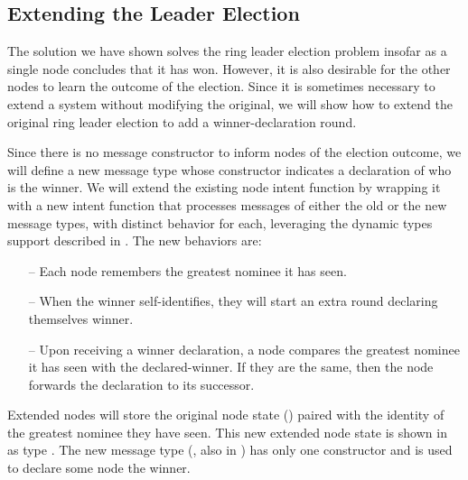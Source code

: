 \documentclass[sigplan,screen]{acmart}
\begin{document}
\subsection{Extending the Leader Election}
\label{sec:dyn-ring}

The solution we have shown solves the ring leader election problem
insofar as a single node concludes that it has won.
%
However, it is also desirable for the other nodes to learn the outcome of the
election.
%
Since it is sometimes necessary to extend a system without modifying the
original, we will show how to extend the original ring leader election to add a
winner-declaration round.

Since there is no message constructor to inform nodes of the election outcome,
we will define a new message type whose constructor indicates a declaration of
who is the winner.
%
We will extend the existing node intent function by wrapping it with a new
intent function that processes messages of either the old or the new message
types, with distinct behavior for each, leveraging the dynamic types support
described in .
%
The new behaviors are:
%
\begin{itemize}[leftmargin=1.5em]
    \item[--] Each node remembers the greatest nominee it has seen.

    \item[--] When the winner self-identifies, they will start an extra round
    declaring themselves winner.

    \item[--] Upon receiving a winner declaration, a node compares the greatest
    nominee it has seen with the declared-winner.
    If they are the same, then the node forwards the declaration to its
    successor.
\end{itemize}

Extended nodes will store the original node state ()
paired with the identity of the greatest nominee they have seen.
%
This new extended node state is shown in  as type
.
%
The new message type (, also in ) has only
one constructor and is used to declare some node the winner.
\end{document}
